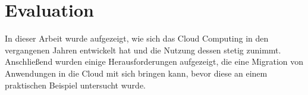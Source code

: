\section{Evaluation}
In dieser Arbeit wurde aufgezeigt, wie sich das Cloud Computing in den vergangenen Jahren entwickelt hat und die Nutzung dessen stetig zunimmt. Anschließend wurden einige Herausforderungen aufgezeigt, die eine Migration von Anwendungen in die Cloud mit sich bringen kann, bevor diese an einem praktischen Beispiel untersucht wurde.